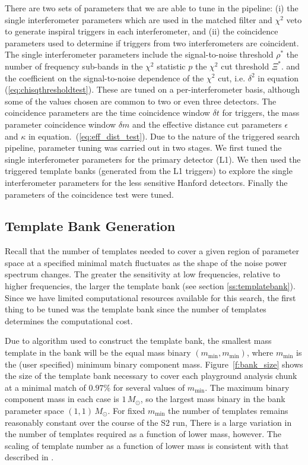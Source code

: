 There are two sets of parameters that we are able to tune in the pipeline: (i)
the single interferometer parameters which are used in the matched filter and
$\chi^2$ veto to generate inspiral triggers in each interferometer, and (ii)
the coincidence parameters used to determine if triggers from two
interferometers are coincident. The single interferometer parameters include
the signal-to-noise threshold $\rho^\ast$ the number of frequency sub-bands in
the $\chi^2$ statistic $p$ the $\chi^2$ cut threshold $\Xi^\ast$.  and the
coefficient on the signal-to-noise dependence of the $\chi^2$ cut, i.e.
$\delta^2$ in equation (\ref{eq:chisqthresholdtest}). These are tuned on a
per-interferometer basis, although some of the values chosen are common to two
or even three detectors.  The coincidence parameters are the time coincidence
window $\delta t$ for triggers, the mass parameter coincidence window $\delta
m$ and the effective distance cut parameters $\epsilon$ and $\kappa$ in
equation.~(\ref{eq:eff_dist_test}).  Due to the nature of the triggered search
pipeline, parameter tuning was carried out in two stages. We first tuned the
single interferometer parameters for the primary detector (L1).  We then used
the triggered template banks (generated from the L1 triggers) to explore the
single interferometer parameters for the less sensitive Hanford detectors.
Finally the parameters of the coincidence test were tuned.

\subsection{Template Bank Generation}
\label{ss:tunebank}

Recall that the number of templates needed to cover a given region of
parameter space at a specified minimal match fluctuates as the shape of the
noise power spectrum changes. The greater the sensitivity at low frequencies,
relative to higher frequencies, the larger the template bank (see 
section \ref{ss:templatebank}). Since we have limited computational resources
available for this search, the first thing to be tuned was the template bank
since the number of templates determines the computational cost.

Due to algorithm used to construct the template bank\cite{Owen:1998dk}, the
smallest mass template in the bank will be the equal mass binary
$(m_\mathrm{min},m_\mathrm{min})$, where $m_\mathrm{min}$ is the (user
specified) minimum binary component mass. Figure~\ref{f:bank_size} shows the
size of the template bank necessary to cover each playground analysis chunk at
a minimal match of $0.97\%$ for several values of $m_\mathrm{min}$.  The
maximum binary component mass in each case is $1\,M_\odot$, so the largest
mass binary in the bank parameter space $(1,1)\,M_\odot$. For fixed
$m_\mathrm{min}$ the number of templates remains reasonably constant over the
course of the S2 run, There is a large variation in the number of templates
required as a function of lower mass, however. The scaling of template number
as a function of lower mass is consistent with that described in
\cite{Owen:1998dk}.

